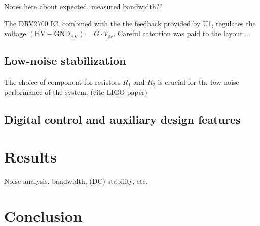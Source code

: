 \documentclass[aip,rsi,reprint]{revtex4-1} %
\begin{document}
Notes here about expected, measured bandwidth??

The DRV2700 IC, combined with the the feedback provided by U1, regulates the voltage $(\text{HV}-\text{GND}_{\text{HV}}) = G\cdot V_{\text{dc}}$.
Careful attention was paid to the layout ...

\subsection{Low-noise stabilization}
\label{Sec:LowNoiseStabilization}

The choice of component for resistors $R_1$ and $R_2$ is crucial for the low-noise performance of the system. (cite LIGO paper)

\subsection{Digital control and auxiliary design features}
\label{Sec:DigControlAuxDesign}

\section{Results}
\label{Sec:Results}
Noise analysis, bandwidth, (DC) stability, etc.


\section{Conclusion}
\label{Sec:Conclusion}



%
%
\end{document}
